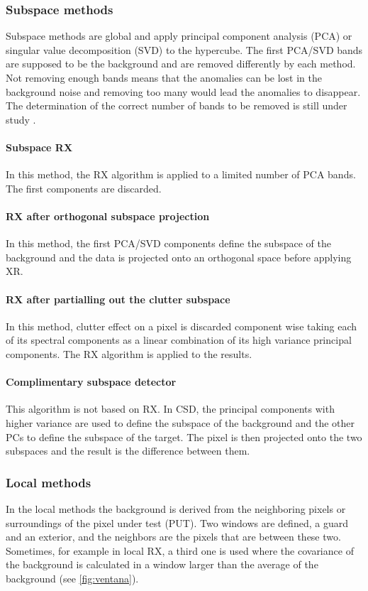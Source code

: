 \subsubsection{Subspace methods}
Subspace methods are global and apply principal component analysis (PCA) or singular value decomposition (SVD) to the hypercube. The first PCA/SVD bands are supposed to be the background and are removed differently by each method. Not removing enough bands means that the anomalies can be lost in the background noise and removing too many would lead the anomalies to disappear. The determination of the correct number of bands to be removed is still under study \cite{borghys_hyperspectral_2012}.

\paragraph{Subspace RX}
In this method, the RX algorithm is applied to a limited number of PCA bands. The first components are discarded.

\paragraph{RX after orthogonal subspace projection \cite{matteoli_tutorial_2010}}
In this method, the first PCA/SVD components define the subspace of the background and the data is projected onto an orthogonal space before applying XR.

\paragraph{RX after partialling out the clutter subspace \cite{lo_hyperspectral_2009}}
In this method, clutter effect on a pixel is discarded component wise taking each of its spectral components as a linear combination of its high variance principal components. The RX algorithm is applied to the results.

\paragraph{Complimentary subspace detector \cite{chein-i_chang_anomaly_2002}}
This algorithm is not based on RX. In CSD, the principal components with higher variance are used to define the subspace of the background and the other PCs to define the subspace of the target. The pixel is then projected onto the two subspaces and the result is the difference between them.

\subsubsection{Local methods}
In the local methods the background is derived from the neighboring pixels or surroundings of the pixel under test (PUT). Two windows are defined, a guard and an exterior, and the neighbors are the pixels that are between these two. Sometimes, for example in local RX, a third one is used where the covariance of the background is calculated in a window larger than the average of the background (see \autoref{fig:ventana}).

